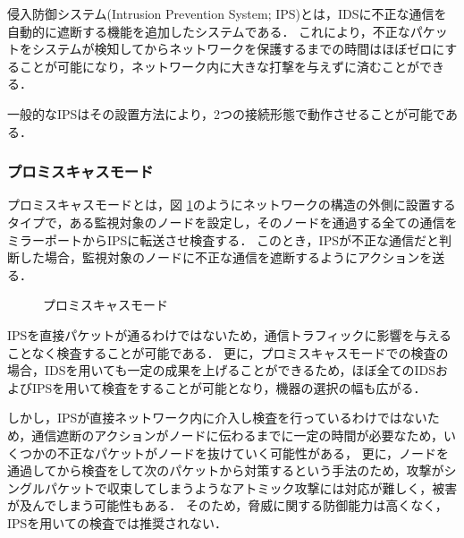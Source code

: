 侵入防御システム(Intrusion Prevention System; IPS)とは，IDSに不正な通信を自動的に遮断する機能を追加したシステムである．
これにより，不正なパケットをシステムが検知してからネットワークを保護するまでの時間はほぼゼロにすることが可能になり，ネットワーク内に大きな打撃を与えずに済むことができる．

一般的なIPSはその設置方法により，2つの接続形態で動作させることが可能である．

\subsubsection{プロミスキャスモード}

プロミスキャスモードとは，図 \ref{fig:2-1}のようにネットワークの構造の外側に設置するタイプで，ある監視対象のノードを設定し，そのノードを通過する全ての通信をミラーポートからIPSに転送させ検査する\cite{ciscoips}．
このとき，IPSが不正な通信だと判断した場合，監視対象のノードに不正な通信を遮断するようにアクションを送る．

\begin{figure}[tb]
	\begin{center}
		\caption{プロミスキャスモード}
		\label{fig:2-1}
	\end{center}
\end{figure}

IPSを直接パケットが通るわけではないため，通信トラフィックに影響を与えることなく検査することが可能である．
更に，プロミスキャスモードでの検査の場合，IDSを用いても一定の成果を上げることができるため，ほぼ全てのIDSおよびIPSを用いて検査をすることが可能となり，機器の選択の幅も広がる．

しかし，IPSが直接ネットワーク内に介入し検査を行っているわけではないため，通信遮断のアクションがノードに伝わるまでに一定の時間が必要なため，いくつかの不正なパケットがノードを抜けていく可能性がある，
更に，ノードを通過してから検査をして次のパケットから対策するという手法のため，攻撃がシングルパケットで収束してしまうようなアトミック攻撃には対応が難しく，被害が及んでしまう可能性もある．
そのため，脅威に関する防御能力は高くなく，IPSを用いての検査では推奨されない．

